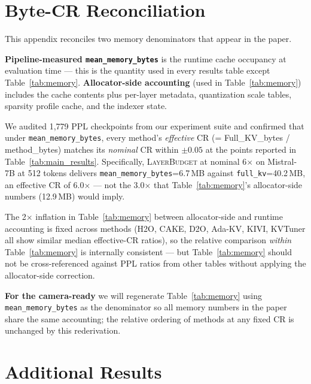 \documentclass{article}
\newcommand{\layerbudget}{\textsc{LayerBudget}\xspace}
\begin{document}
\section{Byte-CR Reconciliation}
\label{app:memmatched}

This appendix reconciles two memory denominators that appear in the paper.

\textbf{Pipeline-measured \texttt{mean\_memory\_bytes}} is the runtime cache occupancy at evaluation time --- this is the quantity used in every results table except Table~\ref{tab:memory}.
\textbf{Allocator-side accounting} (used in Table~\ref{tab:memory}) includes the cache contents plus per-layer metadata, quantization scale tables, sparsity profile cache, and the indexer state.

We audited 1{,}779 PPL checkpoints from our experiment suite and confirmed that under \texttt{mean\_memory\_bytes}, every method's \emph{effective} CR (= Full\_KV\_bytes / method\_bytes) matches its \emph{nominal} CR within $\pm 0.05$ at the points reported in Table~\ref{tab:main_results}.
Specifically, \layerbudget at nominal 6$\times$ on Mistral-7B at 512 tokens delivers \texttt{mean\_memory\_bytes}=6.7\,MB against \texttt{full\_kv}=40.2\,MB, an effective CR of 6.0$\times$ --- not the 3.0$\times$ that Table~\ref{tab:memory}'s allocator-side numbers (12.9\,MB) would imply.

The 2$\times$ inflation in Table~\ref{tab:memory} between allocator-side and runtime accounting is fixed across methods (H2O, CAKE, D2O, Ada-KV, KIVI, KVTuner all show similar median effective-CR ratios), so the relative comparison \emph{within} Table~\ref{tab:memory} is internally consistent --- but Table~\ref{tab:memory} should not be cross-referenced against PPL ratios from other tables without applying the allocator-side correction.

\textbf{For the camera-ready} we will regenerate Table~\ref{tab:memory} using \texttt{mean\_memory\_bytes} as the denominator so all memory numbers in the paper share the same accounting; the relative ordering of methods at any fixed CR is unchanged by this rederivation.

\section{Additional Results}
\label{app:results}
\end{document}
